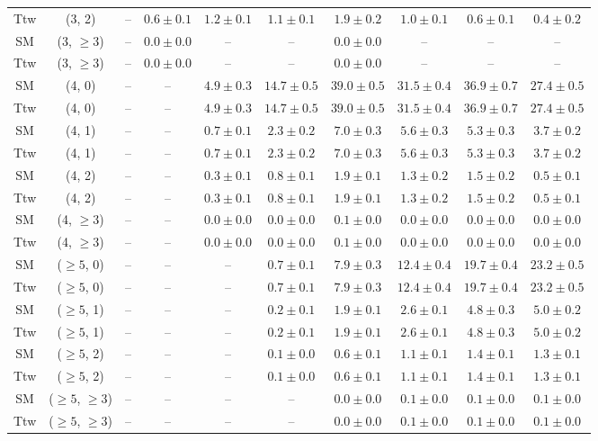 \begin{table}[h!]
{\begin{tabular}{cccccccccc}
	Ttw & (3, 2) & -- & $0.6\pm 0.1$ & $1.2\pm 0.1$ & $1.1\pm 0.1$ & $1.9\pm 0.2$ & $1.0\pm 0.1$ & $0.6\pm 0.1$ & $0.4\pm 0.2$ \\[0.5ex] 
	SM & (3, $\ge3$) & -- & $0.0\pm 0.0$ & -- & -- & $0.0\pm 0.0$ & -- & -- & -- \\[0.5ex] 
	Ttw & (3, $\ge3$) & -- & $0.0\pm 0.0$ & -- & -- & $0.0\pm 0.0$ & -- & -- & -- \\[0.5ex] 
	SM & (4, 0) & -- & -- & $4.9\pm 0.3$ & $14.7\pm 0.5$ & $39.0\pm 0.5$ & $31.5\pm 0.4$ & $36.9\pm 0.7$ & $27.4\pm 0.5$ \\[0.5ex] 
	Ttw & (4, 0) & -- & -- & $4.9\pm 0.3$ & $14.7\pm 0.5$ & $39.0\pm 0.5$ & $31.5\pm 0.4$ & $36.9\pm 0.7$ & $27.4\pm 0.5$ \\[0.5ex] 
	SM & (4, 1) & -- & -- & $0.7\pm 0.1$ & $2.3\pm 0.2$ & $7.0\pm 0.3$ & $5.6\pm 0.3$ & $5.3\pm 0.3$ & $3.7\pm 0.2$ \\[0.5ex] 
	Ttw & (4, 1) & -- & -- & $0.7\pm 0.1$ & $2.3\pm 0.2$ & $7.0\pm 0.3$ & $5.6\pm 0.3$ & $5.3\pm 0.3$ & $3.7\pm 0.2$ \\[0.5ex] 
	SM & (4, 2) & -- & -- & $0.3\pm 0.1$ & $0.8\pm 0.1$ & $1.9\pm 0.1$ & $1.3\pm 0.2$ & $1.5\pm 0.2$ & $0.5\pm 0.1$ \\[0.5ex] 
	Ttw & (4, 2) & -- & -- & $0.3\pm 0.1$ & $0.8\pm 0.1$ & $1.9\pm 0.1$ & $1.3\pm 0.2$ & $1.5\pm 0.2$ & $0.5\pm 0.1$ \\[0.5ex] 
	SM & (4, $\ge3$) & -- & -- & $0.0\pm 0.0$ & $0.0\pm 0.0$ & $0.1\pm 0.0$ & $0.0\pm 0.0$ & $0.0\pm 0.0$ & $0.0\pm 0.0$ \\[0.5ex] 
	Ttw & (4, $\ge3$) & -- & -- & $0.0\pm 0.0$ & $0.0\pm 0.0$ & $0.1\pm 0.0$ & $0.0\pm 0.0$ & $0.0\pm 0.0$ & $0.0\pm 0.0$ \\[0.5ex] 
	SM & ($\ge5$, 0) & -- & -- & -- & $0.7\pm 0.1$ & $7.9\pm 0.3$ & $12.4\pm 0.4$ & $19.7\pm 0.4$ & $23.2\pm 0.5$ \\[0.5ex] 
	Ttw & ($\ge5$, 0) & -- & -- & -- & $0.7\pm 0.1$ & $7.9\pm 0.3$ & $12.4\pm 0.4$ & $19.7\pm 0.4$ & $23.2\pm 0.5$ \\[0.5ex] 
	SM & ($\ge5$, 1) & -- & -- & -- & $0.2\pm 0.1$ & $1.9\pm 0.1$ & $2.6\pm 0.1$ & $4.8\pm 0.3$ & $5.0\pm 0.2$ \\[0.5ex] 
	Ttw & ($\ge5$, 1) & -- & -- & -- & $0.2\pm 0.1$ & $1.9\pm 0.1$ & $2.6\pm 0.1$ & $4.8\pm 0.3$ & $5.0\pm 0.2$ \\[0.5ex] 
	SM & ($\ge5$, 2) & -- & -- & -- & $0.1\pm 0.0$ & $0.6\pm 0.1$ & $1.1\pm 0.1$ & $1.4\pm 0.1$ & $1.3\pm 0.1$ \\[0.5ex] 
	Ttw & ($\ge5$, 2) & -- & -- & -- & $0.1\pm 0.0$ & $0.6\pm 0.1$ & $1.1\pm 0.1$ & $1.4\pm 0.1$ & $1.3\pm 0.1$ \\[0.5ex] 
	SM & ($\ge5$, $\ge3$) & -- & -- & -- & -- & $0.0\pm 0.0$ & $0.1\pm 0.0$ & $0.1\pm 0.0$ & $0.1\pm 0.0$ \\[0.5ex] 
	Ttw & ($\ge5$, $\ge3$) & -- & -- & -- & -- & $0.0\pm 0.0$ & $0.1\pm 0.0$ & $0.1\pm 0.0$ & $0.1\pm 0.0$ \\[0.5ex] 
	\hline
	\hline
\end{tabular}}
\end{table}

